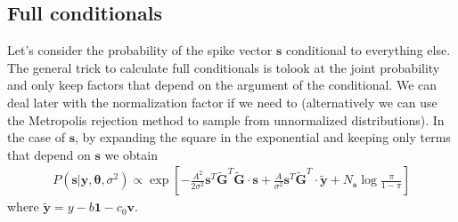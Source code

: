 \documentclass{article}
\theoremstyle{remark}
\begin{document}
\subsection{Full conditionals}
Let's consider the probability of the spike vector $\bm{s}$ conditional to everything else. The general trick to calculate full conditionals is tolook at the joint probability and only keep factors that depend on the argument of the conditional. We can deal later with the normalization factor if we need to (alternatively we can use the Metropolis rejection method to sample from unnormalized distributions). In the case of $\bm{s}$, by expanding the square in the exponential and keeping only terms that depend on $\bm{s}$ we obtain
\begin{align}
    P(\bm{s}|\bm{y},\bm{\theta},\sigma^2) \propto \exp\left[-\frac{A^2}{2\sigma^2}\bm{s}^T\bm{\tilde G}^T\bm{\tilde G}\cdot \bm{s}+\frac{A}{\sigma^2}\bm{s}^T\bm{\tilde G}^T\cdot\bm{\tilde y}+N_{\bm{s}}\log\frac{\pi}{1-\pi}\right]
\end{align}
where $\bm{\tilde y}=y-b\bm{1}-c_0\bm{v}$. 
\end{document}
